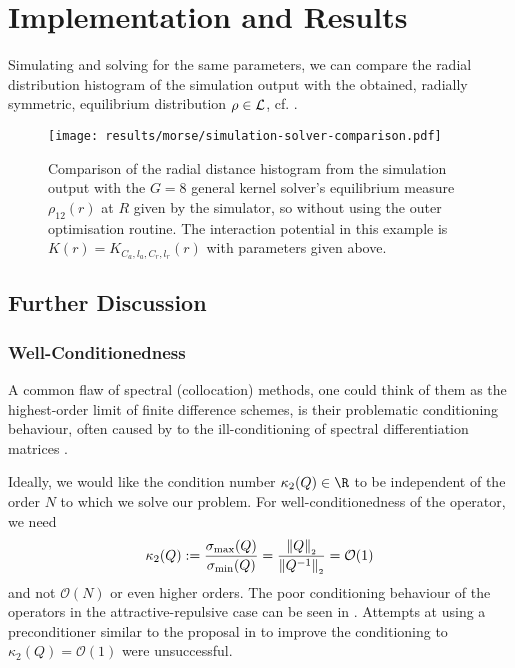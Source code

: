 \chapter{Implementation and Results}
\label{chap:implementation-and-results}

Simulating and solving for the same parameters, we can compare the radial distribution histogram of the simulation output with the obtained, radially symmetric, equilibrium distribution $\rho \in \mathcal{L}$, cf. .


\begin{figure}[H]
  \centering
  \texttt{[image: results/morse/simulation-solver-comparison.pdf]}
  \caption[Comparison of histogram and spectral method solution]{Comparison of the radial distance histogram from the simulation output with the $G = 8$ general kernel solver's equilibrium measure $\rho_{12}(r)$ at $R$ given by the simulator, so without using the outer optimisation routine. The interaction potential in this example is $K(r) = K_{C_a, l_a, C_r, l_r}(r)$ with parameters given above.}
  \label{fig:simulation-solver-comparison}
\end{figure}

\section{Further Discussion}
\subsection{Well-Conditionedness}
A common flaw of spectral (collocation) methods, one could think of them as the highest-order limit of finite difference schemes, is their problematic conditioning behaviour, often caused by to the ill-conditioning of spectral differentiation matrices \parencite{2019-atap}.

Ideally, we would like the condition number $\kappa_2(Q) \in \R$ to be independent of the order $N$ to which we solve our problem.
For well-conditionedness of the operator, we need
$$\kappa_2(Q) := \frac{\sigma_{\rm max}(Q)}{\sigma_{\rm min}(Q)} = \frac{\left\lVert Q\right\rVert_{\scriptscriptstyle 2}}{\left\lVert Q^{-1}\right\rVert_{\scriptscriptstyle 2}} = \mathcal{O}(1)$$
and not $\mathcal{O}(N)$ or even higher orders.
The poor conditioning behaviour of the operators in the attractive-repulsive case can be seen in .
Attempts at using a preconditioner similar to the proposal in \cite{2013-a-fast-and-well-conditioned-spectral-method} to improve the conditioning to $\kappa_2(Q) = \mathcal{O}(1)$ were unsuccessful.

